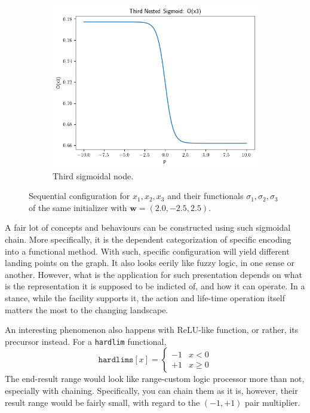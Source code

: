 \begin{figure}[h!]
\begin{subfigure}[b]{0.32\textwidth}
    \label{fig:a_sigmoid_2_2}
  \end{subfigure}\hfill
  \begin{subfigure}[b]{0.32\textwidth}
    \centering
    \includegraphics[width=\textwidth]{img/sigmoid_illus_x3_2.png}
    \caption{Third sigmoidal node.}
    \label{fig:a_sigmoid_3_2}
  \end{subfigure}

  \caption{Sequential configuration for \(x_{1},x_{2},x_{3}\) and their functionals \(\sigma_{1},\sigma_{2},\sigma_{3}\) of the same initializer with \(\mathbf{w}=(2.0,-2.5,2.5)\).}
  \label{fig:sigmoid_illustration_2}
\end{figure}

A fair lot of concepts and behaviours can be constructed using such sigmoidal chain. More specifically, it is the dependent categorization of specific encoding into a functional method. With such, specific configuration will yield different landing points on the graph. It also looks eerily like fuzzy logic, in one sense or another. However, what is the application for such presentation depends on what is the representation it is supposed to be indicted of, and how it can operate. In a stance, while the facility supports it, the action and life-time operation itself matters the most to the changing landscape. 

An interesting phenomenon also happens with ReLU-like function, or rather, its precursor instead. For a \texttt{hardlim} functional, 
\begin{equation}
    \texttt{hardlims}[x] = \begin{cases}
        -1 & x < 0\\
        +1 & x \geq 0 
    \end{cases}
\end{equation}
The end-result range would look like range-custom logic processor more than not, especially with chaining. Specifically, you can chain them as it is, however, their result range would be fairly small, with regard to the $(-1,+1)$ pair multiplier. 

